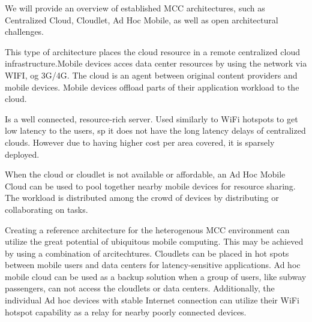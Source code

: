 We will provide an overview of established MCC architectures, such as Centralized Cloud, Cloudlet, Ad Hoc Mobile, as well as open architectural challenges.
\begin{description}[style=nextline]
\item [Centralized Cloud]
This type of architecture places the cloud resource in a remote centralized cloud infrastructure\cite[p.3]{liu2013gearing}.Mobile devices acces data center resources by using the network via WIFI, og 3G/4G. The cloud is an agent between original content providers and mobile devices. Mobile devices offload parts of their application workload to the cloud.
\item [Cloudlet]
Is a well connected, resource-rich server\cite[p.3-4]{liu2013gearing}. Used similarly to WiFi hotspots to get low latency to the users, sp it does not have the long latency delays of centralized clouds. However due to having higher cost per area covered, it is sparsely deployed.
\item [Ad Hoc Mobile Cloud]
When the cloud or cloudlet is not available or affordable, an Ad Hoc Mobile Cloud can be used to pool together nearby mobile devices for resource sharing\cite[p.4]{liu2013gearing}. The workload is distributed among the crowd of devices by distributing or collaborating on tasks. 
\item [Architectural Challenges]
Creating a reference architecture for the heterogenous MCC environment can utilize the great potential of ubiquitous mobile computing\cite{sanaei2014heterogeneity}. This may be achieved by using a combination of arcitechtures. Cloudlets can be placed in hot spots between mobile users and data centers for latency-sensitive applications. Ad hoc mobile cloud can be used as a backup solution when a group of users, like subway passengers, can not access the cloudlets or data centers. Additionally, the individual Ad hoc devices with stable Internet connection can utilize their WiFi hotspot capability as a relay for nearby poorly connected devices.




\end{description}